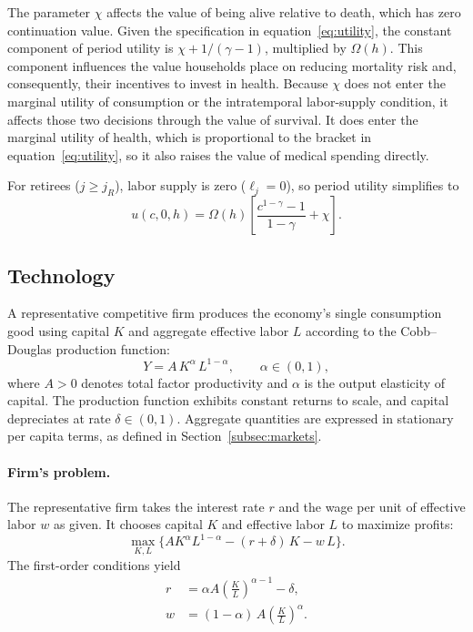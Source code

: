 \documentclass[12pt,a4paper]{article}
\begin{document}
The parameter $\chi$ affects the value of being alive relative to death, which has zero continuation value. Given the specification in equation~\eqref{eq:utility}, the constant component of period utility is $\chi + 1/(\gamma-1)$, multiplied by $\Omega(h)$. This component influences the value households place on reducing mortality risk and, consequently, their incentives to invest in health. Because $\chi$ does not enter the marginal utility of consumption or the intratemporal labor-supply condition, it affects those two decisions through the value of survival. It does enter the marginal utility of health, which is proportional to the bracket in equation~\eqref{eq:utility}, so it also raises the value of medical spending directly.

For retirees ($j \geq j_R$), labor supply is zero ($\ell_j = 0$), so period utility simplifies to \[
u(c,0,h) = \Omega(h)\left[\frac{c^{1-\gamma}-1}{1-\gamma}+\chi\right].
\]



\subsection{Technology}
\label{subsec:technology}

A representative competitive firm produces the economy's single consumption good using capital $K$ and aggregate effective labor $L$ according to the Cobb--Douglas production function:
\begin{equation}
\label{eq:production}
Y = A\, K^\alpha\, L^{1-\alpha}, \qquad \alpha \in (0,1),
\end{equation}
where $A > 0$ denotes total factor productivity and $\alpha$ is the output elasticity of capital. The production function exhibits constant returns to scale, and capital depreciates at rate $\delta \in (0,1)$. Aggregate quantities are expressed in stationary per capita terms, as defined in Section~\ref{subsec:markets}.

\paragraph{Firm's problem.}
The representative firm takes the interest rate $r$ and the wage per unit of effective labor $w$ as given. It chooses capital $K$ and effective labor $L$ to maximize profits:
\begin{equation}
\label{eq:firm_problem}
\max_{K, L} \bigl\{A K^\alpha L^{1-\alpha} - (r+\delta)\,K - w\,L\bigr\}.
\end{equation}
The first-order conditions yield
\begin{align}
r &= \alpha A \left(\frac{K}{L}\right)^{\alpha-1} - \delta, \label{eq:foc_r} \\
w &= (1-\alpha)\, A \left(\frac{K}{L}\right)^{\alpha}. \label{eq:foc_w}
\end{align}
\end{document}
